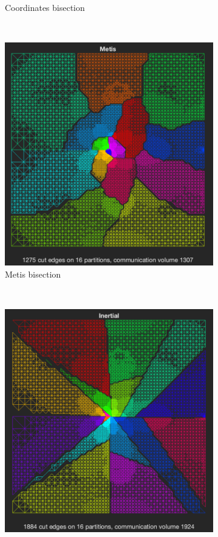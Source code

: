 \begin{figure}[H]
\begin{subfigure}{0.5\textwidth}
		\caption{Coordinates bisection}
		\label{fig:coord_crack}
	\end{subfigure}\\
	\begin{subfigure}{0.5\textwidth}
		\includegraphics[width=\textwidth]{./media/metis_crack.png}
		\caption{Metis bisection}
		\label{fig:metis_crack}
	\end{subfigure}%
    ~
	\begin{subfigure}{0.5\textwidth}
		\includegraphics[width=\textwidth]{./media/inert_crack.png}

\end{subfigure}
\end{figure}
